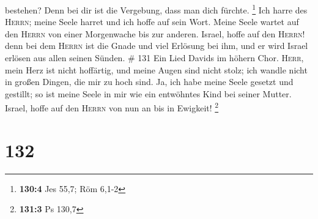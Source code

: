 bestehen?  Denn bei dir ist die Vergebung, dass man dich
fürchte. \footnote{\textbf{130:4} Jes 55,7; Röm 6,1-2} 
Ich harre des \textsc{Herrn}; meine Seele harret und ich hoffe auf sein
Wort.  Meine Seele wartet auf den \textsc{Herrn} von einer
Morgenwache bis zur anderen.  Israel, hoffe auf den
\textsc{Herrn}! denn bei dem \textsc{Herrn} ist die Gnade und viel
Erlösung bei ihm,  und er wird Israel erlösen aus allen
seinen Sünden. \# 131  Ein Lied Davids im höhern Chor.
\textsc{Herr}, mein Herz ist nicht hoffärtig, und meine Augen sind nicht
stolz; ich wandle nicht in großen Dingen, die mir zu hoch sind.
 Ja, ich habe meine Seele gesetzt und gestillt; so ist
meine Seele in mir wie ein entwöhntes Kind bei seiner Mutter.
 Israel, hoffe auf den \textsc{Herrn} von nun an bis in
Ewigkeit! \footnote{\textbf{131:3} Ps 130,7}

\hypertarget{section-42}{%
\section{132}\label{section-42}}

